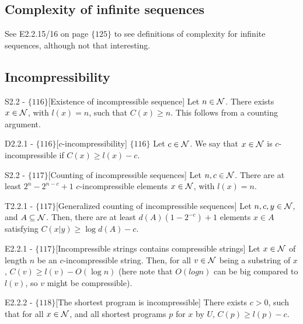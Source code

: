\documentclass{article}
\begin{document}
\subsection{Complexity of infinite sequences}

See E2.2.15/16 on page $\{125\}$ to see definitions of complexity for infinite sequences, although not that interesting.

\subsection{Incompressibility}

\begin{flexilemma}{S2.2 - $\{116\}$}[Existence of incompressible sequence]
    Let $n \in \mathcal{N}$. There exists $x \in \mathcal{N}$, with $l(x) = n$, such that $C(x) \geq n$. This follows from a counting argument.
\end{flexilemma}
\begin{flexidefinition}{D2.2.1 - $\{116\}$}[$c$-incompressibility]
$\{116\}$ Let $c \in \mathcal{N}$. We say that $x \in \mathcal{N}$ is $c$-incompressible if $C(x) \geq l(x) - c$.
\end{flexidefinition}
\begin{flexilemma}{S2.2 - $\{117\}$}[Counting of incompressible sequences]
    Let $n,c \in \mathcal{N}$. There are at least $2^n - 2^{n-c} + 1$ $c$-incompressible elements $x \in \mathcal{N}$, with $l(x) = n$.
\end{flexilemma}

\begin{flexitheorem}{T2.2.1 - $\{117\}$}[Generalized counting of incompressible sequences]
    Let $n,c,y \in \mathcal{N}$, and $A \subseteq \mathcal{N}$. Then, there are at least $d(A)(1 - 2^{-c}) + 1$ elements $x \in A$ satisfying $C(x|y) \geq \log d(A) - c$.
\end{flexitheorem}

\begin{flexilemma}{E2.2.1 - $\{117\}$}[Incompressible strings contains compressible strings]
    Let $x \in \mathcal{N}$ of length $n$ be an $c$-incompressible string. Then, for all $v \in \mathcal{N}$ being a substring of $x$, $C(v) \geq l(v) - O(\log n)$ (here note that $O(log n)$ can be big compared to $l(v)$, so $v$ might be compressible).
\end{flexilemma}

\begin{flexilemma}{E2.2.2 - $\{118\}$}[The shortest program is incompressible]
    There exists $c > 0$, such that for all $x \in \mathcal{N}$, and all shortest programs $p$ for $x$ by $U$, $C(p) \geq l(p) - c$.
\end{flexilemma}
\end{document}
